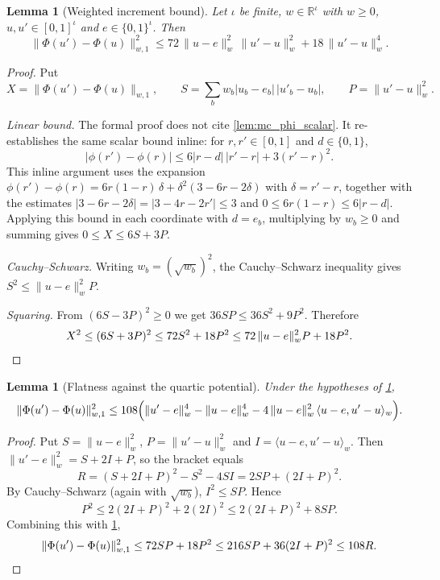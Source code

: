 \documentclass[11pt]{article}
\newtheorem{lemma}[theorem]{Lemma}
\theoremstyle{definition}
\theoremstyle{remark}
\newcommand{\R}{\mathbb{R}}
\newcommand{\wn}[1]{\lVert #1\rVert_{w,1}}
\newcommand{\hn}[1]{\lVert #1\rVert_{w}}
\newcommand{\ip}[2]{\langle #1,#2\rangle_{w}}
\begin{document}
\begin{lemma}[Weighted increment bound]\label{lem:mc_flat_increment}
Let $\iota$ be finite, $w\in\R^\iota$ with $w\ge0$, $u,u'\in[0,1]^\iota$ and $e\in\{0,1\}^\iota$. Then
\[
\wn{\Phi(u')-\Phi(u)}^2\le72\,\hn{u-e}^2\,\hn{u'-u}^2+18\,\hn{u'-u}^4 .
\]
\end{lemma}
\begin{proof}
Put
\[
X=\wn{\Phi(u')-\Phi(u)},\qquad S=\sum_bw_b|u_b-e_b|\,|u'_b-u_b|,\qquad P=\hn{u'-u}^2.
\]

\emph{Linear bound.} The formal proof does not cite \cref{lem:mc_phi_scalar}. It re-establishes the same scalar bound inline: for $r,r'\in[0,1]$ and $d\in\{0,1\}$,
\[
|\phi(r')-\phi(r)|\le6|r-d|\,|r'-r|+3(r'-r)^2 .
\]
This inline argument uses the expansion $\phi(r')-\phi(r)=6r(1-r)\,\delta+\delta^2(3-6r-2\delta)$ with $\delta=r'-r$, together with the estimates $|3-6r-2\delta|=|3-4r-2r'|\le3$ and $0\le6r(1-r)\le6|r-d|$. Applying this bound in each coordinate with $d=e_b$, multiplying by $w_b\ge0$ and summing gives $0\le X\le6S+3P$.

\emph{Cauchy--Schwarz.} Writing $w_b=(\sqrt{w_b})^2$, the Cauchy--Schwarz inequality gives $S^2\le\hn{u-e}^2P$.

\emph{Squaring.} From $(6S-3P)^2\ge0$ we get $36SP\le36S^2+9P^2$. Therefore
\[
X^2\le(6S+3P)^2\le72S^2+18P^2\le72\,\hn{u-e}^2P+18P^2. \qedhere
\]
\end{proof}

\begin{lemma}[Flatness against the quartic potential]\label{lem:mc_flat}
Under the hypotheses of \cref{lem:mc_flat_increment},
\[
\wn{\Phi(u')-\Phi(u)}^2\le108\Bigl(\hn{u'-e}^4-\hn{u-e}^4-4\,\hn{u-e}^2\,\ip{u-e}{u'-u}\Bigr).
\]
\end{lemma}
\begin{proof}
Put $S=\hn{u-e}^2$, $P=\hn{u'-u}^2$ and $I=\ip{u-e}{u'-u}$. Then $\hn{u'-e}^2=S+2I+P$, so the bracket equals
\[
R=(S+2I+P)^2-S^2-4SI=2SP+(2I+P)^2 .
\]
By Cauchy--Schwarz (again with $\sqrt{w_b}$), $I^2\le SP$. Hence
\[
P^2\le2(2I+P)^2+2(2I)^2\le2(2I+P)^2+8SP .
\]
Combining this with \cref{lem:mc_flat_increment},
\[
\wn{\Phi(u')-\Phi(u)}^2\le72SP+18P^2\le216SP+36(2I+P)^2\le108R. \qedhere
\]
\end{proof}
\end{document}
